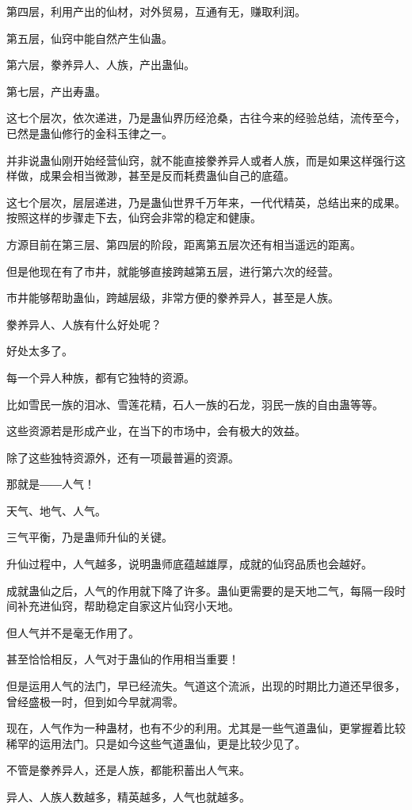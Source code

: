 \begin{this_body}
第四层，利用产出的仙材，对外贸易，互通有无，赚取利润。

第五层，仙窍中能自然产生仙蛊。

第六层，豢养异人、人族，产出蛊仙。

第七层，产出寿蛊。

这七个层次，依次递进，乃是蛊仙界历经沧桑，古往今来的经验总结，流传至今，已然是蛊仙修行的金科玉律之一。

并非说蛊仙刚开始经营仙窍，就不能直接豢养异人或者人族，而是如果这样强行这样做，成果会相当微渺，甚至是反而耗费蛊仙自己的底蕴。

这七个层次，层层递进，乃是蛊仙世界千万年来，一代代精英，总结出来的成果。按照这样的步骤走下去，仙窍会非常的稳定和健康。

方源目前在第三层、第四层的阶段，距离第五层次还有相当遥远的距离。

但是他现在有了市井，就能够直接跨越第五层，进行第六次的经营。

市井能够帮助蛊仙，跨越层级，非常方便的豢养异人，甚至是人族。

豢养异人、人族有什么好处呢？

好处太多了。

每一个异人种族，都有它独特的资源。

比如雪民一族的泪冰、雪莲花精，石人一族的石龙，羽民一族的自由蛊等等。

这些资源若是形成产业，在当下的市场中，会有极大的效益。

除了这些独特资源外，还有一项最普遍的资源。

那就是――人气！

天气、地气、人气。

三气平衡，乃是蛊师升仙的关键。

升仙过程中，人气越多，说明蛊师底蕴越雄厚，成就的仙窍品质也会越好。

成就蛊仙之后，人气的作用就下降了许多。蛊仙更需要的是天地二气，每隔一段时间补充进仙窍，帮助稳定自家这片仙窍小天地。

但人气并不是毫无作用了。

甚至恰恰相反，人气对于蛊仙的作用相当重要！

但是运用人气的法门，早已经流失。气道这个流派，出现的时期比力道还早很多，曾经盛极一时，但到如今早就凋零。

现在，人气作为一种蛊材，也有不少的利用。尤其是一些气道蛊仙，更掌握着比较稀罕的运用法门。只是如今这些气道蛊仙，更是比较少见了。

不管是豢养异人，还是人族，都能积蓄出人气来。

异人、人族人数越多，精英越多，人气也就越多。


\end{this_body}
